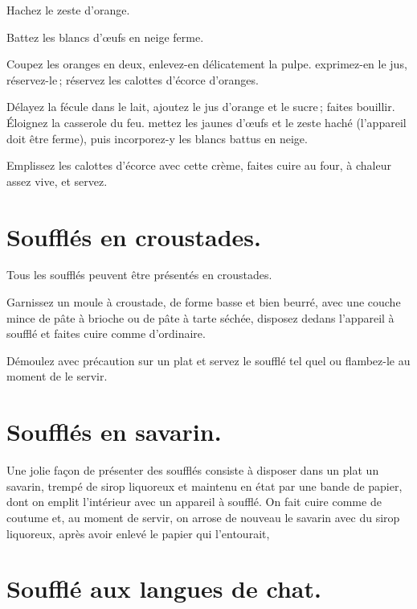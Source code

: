 Hachez le zeste d'orange.

Battez les blancs d'œufs en neige ferme.

Coupez les oranges en deux, enlevez-en délicatement la pulpe. exprimez-en le
jus, réservez-le ; réservez les calottes d'écorce d'oranges.

Délayez la fécule dans le lait, ajoutez le jus d'orange et le sucre ; faites
bouillir. Éloignez la casserole du feu. mettez les jaunes d'œufs et le zeste
haché (l'appareil doit être ferme), puis incorporez-y les blancs battus en
neige.

Emplissez les calottes d'écorce avec cette crème, faites cuire au four,
à chaleur assez vive, et servez.

\section*{\centering Soufflés en croustades.}
{}

Tous les soufflés peuvent être présentés en croustades.

Garnissez un moule à croustade, de forme basse et bien beurré, avec une couche
mince de pâte à brioche ou de pâte à tarte séchée, disposez dedans l'appareil à
soufflé et faites cuire comme d'ordinaire.

Démoulez avec précaution sur un plat et servez le soufflé tel quel ou flambez-le
au moment de le servir.

\section*{\centering Soufflés en savarin.}
{}

Une jolie façon de présenter des soufflés consiste à disposer dans un plat un
savarin, trempé de sirop liquoreux et maintenu en état par une bande de papier,
dont on emplit l'intérieur avec un appareil à soufflé. On fait cuire comme de
coutume et, au moment de servir, on arrose de nouveau le savarin avec du sirop
liquoreux, après avoir enlevé le papier qui l'entourait,

\section*{\centering Soufflé aux langues de chat.}
{}

